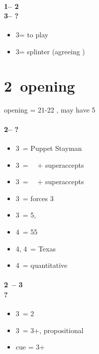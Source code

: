 \documentclass[12pt, a4paper]{report}
\begin{document}
{{        \subsubsection*{1\nt -- 2\nt\\
                        3\minor -- ?}
        \begin{itemize}
            \item 3\diams = to play
            \item 3\major = splinter (agreeing \diams)
        \end{itemize}
    }

    \chapter*{\colorbox{Plum!30}{2\ntch\ opening}}
     {
        
        \alrts{2\nt} opening = 21-22 \bal, may have 5\major

        \subsubsection*{2\nt -- ?}
        \begin{itemize}
            \item 3\clubs\ = Puppet Stayman
            \item 3\diams\ = \then\ \hearts\ + superaccepts
            \item 3\hearts\ = \then\ \spades\ + superaccepts
            \item 3\spades\ = forces 3\nt
            \item 3\nt\ = 5\hearts, \nf \imp
            \item 4\clubs\ = 55\major
            \item 4\diams, 4\hearts\ = Texas
            \item 4\nt\ = quantitative
        \end{itemize}

        \subsubsection*{2\ntx\ -- 3\diams \\ ?}
        \begin{itemize}
            \item 3\hearts\ = 2\hearts
            \item 3\nt\ = 3+\hearts, propositional
            \item cue = 3+\hearts
        \end{itemize}

}}
\end{document}
